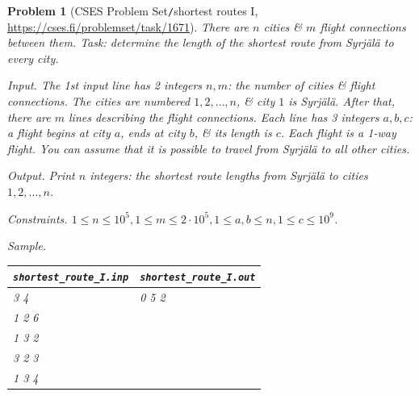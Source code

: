 \documentclass[oneside]{book}
\newtheorem{problem}{Problem}
\begin{document}
\begin{problem}[CSES Problem Set{\tt/}shortest routes I, \url{https://cses.fi/problemset/task/1671}]
	There are $n$ cities \& $m$ flight connections between them. Task: determine the length of the shortest route from Syrjälä to every city.
	\item {\sf Input.} The 1st input line has 2 integers $n,m$: the number of cities \& flight connections. The cities are numbered $1,2,\ldots,n$, \& city $1$ is Syrjälä. After that, there are $m$ lines describing the flight connections. Each line has 3 integers $a,b,c$: a flight begins at city $a$, ends at city $b$, \& its length is $c$. Each flight is a 1-way flight. You can assume that it is possible to travel from Syrjälä to all other cities.
	\item {\sf Output.} Print $n$ integers: the shortest route lengths from Syrjälä to cities $1,2,\ldots,n$.
	\item {\sf Constraints.} $1\le n\le10^5,1\le m\le2\cdot10^5,1\le a,b\le n,1\le c\le10^9$.
	\item {\sf Sample.}
	\begin{table}[H]
		\centering
		\begin{tabular}{|l|l|}
			\hline
			\verb|shortest_route_I.inp| & \verb|shortest_route_I.out| \\
			\hline
			3 4 & 0 5 2 \\
			1 2 6 & \\
			1 3 2 & \\
			3 2 3 & \\
			1 3 4 & \\
			\hline
		\end{tabular}
	\end{table}
\end{problem}
\end{document}
